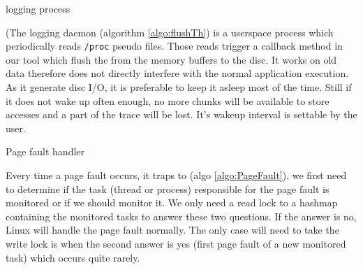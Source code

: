 \begin{algorithm}[htb]
    \caption{logging process}
    \label{algo:flushTh}
    \begin{algorithmic}[1]
                \State {}
                \State {}
                \State {}
                \EndFor
            \EndFor
            \State {}
        \EndWhile
    \end{algorithmic}
\end{algorithm}

(The logging daemon (algorithm \ref{algo:flushTh}) is a userspace process
which periodically reads \texttt{/proc} pseudo files. Those reads trigger a
callback method in our tool which flush the  from the memory buffers to the
disc. It works on old data therefore does not directly interfere with the
normal application execution. As it generate disc I/O, it is preferable to
keep it asleep most of the time. Still if it does not wake up often enough, no
more chunks will be available to store accesses and a part of the trace will
be lost. It's wakeup interval is settable by the user.

\begin{algorithm}[htb]
    \caption{Page fault handler}
    \label{algo:PageFault}
    \begin{algorithmic}[1]
                    \State {}
                    \State {}
                    \State \Return
                \EndIf
            \EndIf
            \State {}
            \State {}
                \State {}
            \EndIf
            \State {}
            \State {}
        \EndFunction
    \end{algorithmic}
\end{algorithm}

Every time a page fault occurs, it traps to \Moca (algo
\ref{algo:PageFault}), we first need to determine if the task
(thread or process) responsible for the page fault is
monitored or if we should monitor it. We only need a read lock
to a hashmap containing the monitored tasks to answer these
two questions. If the answer is no, Linux will handle the page
fault normally. The only case will need to take the write lock
is when the second answer is yes (first page fault of a new
monitored task) which occurs quite rarely.

